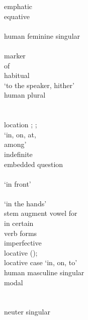 \begin{multicols}{2}
\begin{tabbing}
				\>	emphatic \\
				\>	equative \\
				\>	\\
				\>	human feminine singular\\
				\>	\\
				\>  marker\\
				\>  of \\
				\>	habitual\\
				\>	 `to the speaker, hither'\\
				\>	human plural\\
				\>	\\
				\>	\\
				\>	location \sqt{in};  ;\\
			{}		\>	     `in, on, at, \\ \> among' \\
				\>	indefinite\\
				\>	embedded question\\
				\>	\\
				\>	 `in front'\\
				\>	\\
						\>  `in the hands'\\
				\>	stem augment vowel for \\ \>  in certain \\ \> verb forms\\
				\>	imperfective\\
				\>	locative ();\\
			{}		\>	locative case `in, on, to'\\
					\>	human masculine singular\\
				\>	modal\\
				\>	\\
				\>	\\
					\>	neuter singular\\
				\>	\\
				\>	\\

\end{tabbing}
\end{multicols}
